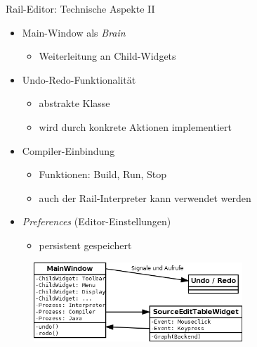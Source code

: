 \begin{frame}{Rail-Editor: Technische Aspekte II}
	\begin{itemize}
		\item Main-Window als \textit{Brain}
		\begin{itemize}
			\item Weiterleitung an Child-Widgets
		\end{itemize}
		\pause
		\item Undo-Redo-Funktionalität
		\begin{itemize}
			\item abstrakte Klasse
			\item wird durch konkrete Aktionen implementiert
		\end{itemize}
		\pause
		\item Compiler-Einbindung
		\begin{itemize}
			\item Funktionen: Build, Run, Stop
			\item auch der Rail-Interpreter kann verwendet werden
		\end{itemize}
		\pause
		\item \textit{Preferences} (Editor-Einstellungen)
		\begin{itemize}
			\item persistent gespeichert
		\end{itemize}
	\end{itemize}
	\pause
	
	\begin{figure}
		\centering
		\includegraphics[width=0.7\textwidth]{editor-uebersicht}
	\end{figure}
\end{frame}
